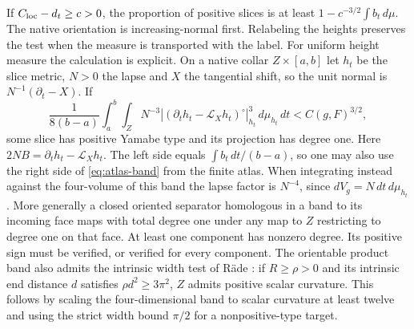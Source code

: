 \documentclass[11pt,letterpaper]{article}
\numberwithin{equation}{section}
\theoremstyle{definition}
\begin{document}
If \(C_{\rm loc}-d_t\ge c>0\), the proportion of positive slices is
at least \(1-c^{-3/2}\int b_t\,d\mu\). The native orientation is
increasing-normal first. Relabeling the heights preserves the test
when the measure is transported with the label. For uniform height
measure the calculation is explicit. On a native collar
\(Z\times[a,b]\) let \(h_t\) be the slice metric, \(N>0\) the lapse and
\(X\) the tangential shift, so the unit normal is
\(N^{-1}(\partial_t-X)\). If
\begin{equation}\label{eq:marked-average}
 \frac{1}{8(b-a)}\int_a^b\!\!\int_Z
  N^{-3}|(\partial_t h_t-\mathcal L_X h_t)^\circ|_{h_t}^3
                \,d\mu_{h_t}\,dt < C(g,F)^{3/2},
\end{equation}
some slice has positive Yamabe type and its projection has degree one.
Here \(2NB=\partial_t h_t-\mathcal L_Xh_t\).
The left side equals \(\int b_t\,dt/(b-a)\), so one may also use the
right side of \eqref{eq:atlas-band} from the finite atlas.
When integrating instead against the four-volume of this band the
lapse factor is \(N^{-4}\), since \(dV_g=N\,dt\,d\mu_{h_t}\). More generally a closed oriented
separator homologous in a band to its incoming face maps with total
degree one under any map to \(Z\) restricting to degree one on that face.
At least one component has nonzero degree. Its positive sign must be
verified, or verified for every component. The orientable product band
also admits the intrinsic width test of R\"ade
\cite[Corollary 2.25]{Raede2022Bands}: if \(R\ge\rho>0\) and its intrinsic
end distance \(d\) satisfies \(\rho d^2\ge3\pi^2\), \(Z\) admits positive
scalar curvature. This follows by scaling the four-dimensional band to
scalar curvature at least twelve and using the strict width bound
\(\pi/2\) for a nonpositive-type target.
\end{document}
